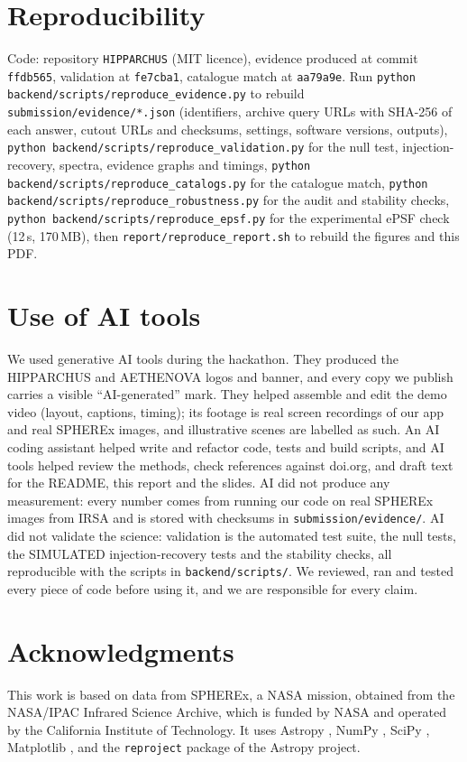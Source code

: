 \documentclass[11pt,a4paper]{article}
\begin{document}
\section{Reproducibility}
\sloppy %
Code: repository \texttt{HIPPARCHUS} (MIT licence), evidence produced at commit \texttt{ffdb565}, validation at \texttt{fe7cba1}, catalogue match at \texttt{aa79a9e}. Run
\texttt{python backend/scripts/reproduce\_evidence.py} to rebuild \texttt{submission/evidence/*.json} (identifiers,
archive query URLs with SHA-256 of each answer, cutout URLs and checksums, settings, software versions, outputs),
\texttt{python backend/scripts/reproduce\_validation.py} for the null test, injection-recovery, spectra, evidence
graphs and timings, \texttt{python backend/scripts/reproduce\_catalogs.py} for the catalogue match,
\texttt{python backend/scripts/reproduce\_robustness.py} for the audit and stability checks, \texttt{python backend/scripts/reproduce\_epsf.py} for the experimental ePSF check (12\,s, 170\,MB), then \texttt{report/reproduce\_report.sh} to rebuild the figures and this PDF.

\section*{Use of AI tools}
We used generative AI tools during the hackathon. They produced the HIPPARCHUS and AETHENOVA logos and banner, and
every copy we publish carries a visible ``AI-generated'' mark. They helped assemble and edit the demo video (layout,
captions, timing); its footage is real screen recordings of our app and real SPHEREx images, and illustrative scenes
are labelled as such. An AI coding assistant helped write and refactor code, tests and build scripts, and AI tools
helped review the methods, check references against doi.org, and draft text for the README, this report and the
slides. AI did not produce any measurement: every number comes from running our code on real SPHEREx images from IRSA
and is stored with checksums in \texttt{submission/evidence/}. AI did not validate the science: validation is the
automated test suite, the null tests, the SIMULATED injection-recovery tests and the stability checks, all reproducible
with the scripts in \texttt{backend/scripts/}. We reviewed, ran and tested every piece of code before using it, and we
are responsible for every claim.

\section*{Acknowledgments}
This work is based on data from SPHEREx, a NASA mission, obtained from the NASA/IPAC Infrared Science Archive, which is
funded by NASA and operated by the California Institute of Technology. It uses Astropy
\parencite{astropy2013,astropy2018,astropy2022}, NumPy \parencite{numpy2020}, SciPy \parencite{scipy2020}, Matplotlib
\parencite{matplotlib2007}, and the \texttt{reproject} package of the Astropy project.

\printbibliography
\end{document}
